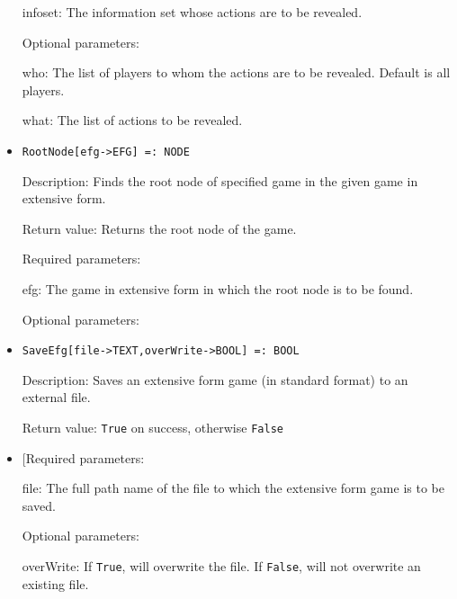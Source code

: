 \begin{itemize}
\bd
\item
[infoset:] The information set whose actions are to be revealed.  
\ed

\item
[Optional parameters:]\hfil\null
\bd
\item
[who:] The list of players to whom the actions are to be revealed.
Default is all players. 
\item
[what:] The list of actions to be revealed.  
\ed

\ed


\item
\protect \large \begin{verbatim}
RootNode[efg->EFG] =: NODE
\end{verbatim}\normalsize

\bd
\item
[Description:] Finds the root node of specified game in the given
game in extensive form.  
\item
[Return value:] Returns the root node of the game.
\item
[Required parameters:]\hfil\null
	
\bd
\item
[efg:] The game in extensive form in which the root node is to be
found.
\ed

\item
[Optional parameters:]\hfil\null

\ed


\item
\protect \large \begin{verbatim}
SaveEfg[file->TEXT,overWrite->BOOL] =: BOOL
\end{verbatim}\normalsize

\bd
\item
[Description:] Saves an extensive form game (in standard format) to an
external file.  
\item
[Return value:] \verb+True+ on success, otherwise \verb+False+
\item

[Required parameters:

\bd
\item
[file:] The full path name of the file to which the extensive form game
is to be saved. \ed

\item
[Optional parameters:]\hfil\null
\bd
\item
[overWrite:] If \verb+True+, will overwrite the file.  If \verb+False+, will
not overwrite an existing file.  
\ed
\ed


\end{itemize}
